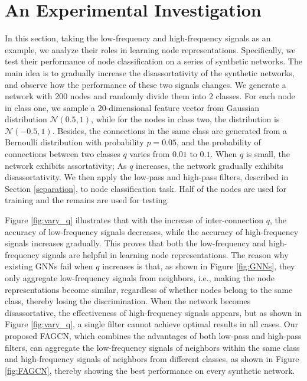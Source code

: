 \documentclass[letterpaper]{article} %
\begin{document}
\section{An Experimental Investigation}
\label{case}

In this section, taking the low-frequency and high-frequency signals as an example, we analyze their roles in learning node representations. Specifically, we test their performance of node classification on a series of synthetic networks.
The main idea is to gradually increase the disassortativity of the synthetic networks, and observe how the performance of these two signals changes.
We generate a network with 200 nodes and randomly divide them into 2 classes.
For each node in class one, we sample a 20-dimensional feature vector from Gaussian distribution $\mathcal{N}(0.5,1)$, while for the nodes in class two, the distribution is $\mathcal{N}(-0.5,1)$.
Besides, the connections in the same class are generated from a Bernoulli distribution with probability $p=0.05$, and the probability of connections between two classes $q$ varies from $0.01$ to $0.1$. When $q$ is small, the network exhibits assortativity; As $q$ increases, the network gradually exhibits disassortativity.
We then apply the low-pass and high-pass filters, described in Section \ref{separation}, to node classification task. Half of the nodes are used for training and the remains are used for testing.

Figure \ref{fig:vary_q} illustrates that with the increase of inter-connection $q$, the accuracy of low-frequency signals decreases, while the accuracy of high-frequency signals increases gradually.
This proves that both the low-frequency and high-frequency signals are helpful in learning node representations.
The reason why existing GNNs fail when $q$ increases is that, as shown in Figure \ref{fig:GNNs}, they only aggregate low-frequency signals from neighbors, i.e., making the node representations become similar, regardless of whether nodes belong to the same class, thereby losing the discrimination.
When the network becomes disassortative, the effectiveness of high-frequency signals appears, but as shown in Figure \ref{fig:vary_q}, a single filter cannot achieve optimal results in all cases. Our proposed FAGCN, which combines the advantages of both low-pass and high-pass filters, can aggregate the low-frequency signals of neighbors within the same class and high-frequency signals of neighbors from different classes, as shown in Figure \ref{fig:FAGCN}, thereby showing the best performance on every synthetic network.
\end{document}

